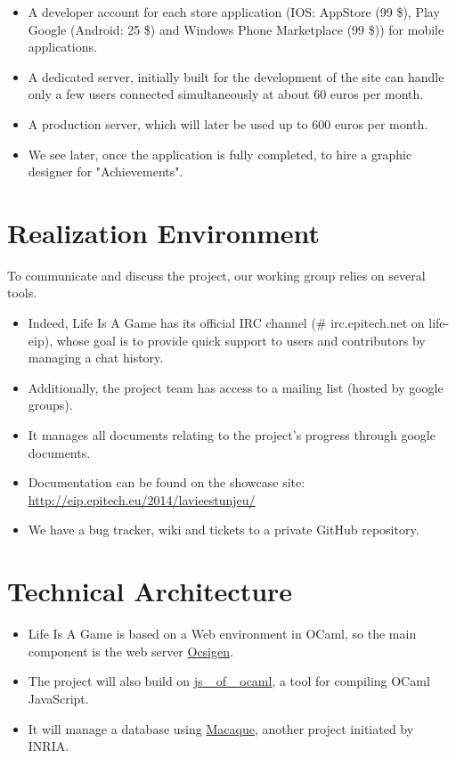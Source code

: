 \documentclass{life-fr}
\begin{document}
\begin{itemize}
  \item A developer account for each store application (IOS: AppStore (99 \$), Play Google (Android: 25 \$) and Windows Phone Marketplace (99 \$)) for mobile applications.
  \item A dedicated server, initially built for the development of the site can handle only a few users connected simultaneously at about 60 euros per month.
  \item A production server, which will later be used up to 600 euros per month.
  \item We see later, once the application is fully completed, to hire a graphic designer for "Achievements".
\end{itemize}

\newpage

\section{Realization Environment}

To communicate and discuss the project, our working group relies on several tools.

\begin{itemize}
  \item Indeed, Life Is A Game has its official IRC channel (\# irc.epitech.net on life-eip), whose goal is to provide quick support to users and contributors by managing a chat history.
  \item Additionally, the project team has access to a mailing list (hosted by google groups).
  \item It manages all documents relating to the project's progress through google documents.
  \item Documentation can be found on the showcase site: \url {http://eip.epitech.eu/2014/lavieestunjeu/}
  \item We have a bug tracker, wiki and tickets to a private GitHub repository.
\end{itemize}

\section{Technical Architecture}

\begin{itemize}
  \item Life Is A Game is based on a Web environment in OCaml, so the main component is the web server \href{http://ocsigen.org/}{Ocsigen}.
  \item The project will also build on \href {http://ocsigen.org/js_of_ocaml/}{js \_of \_ocaml}, a tool for compiling OCaml JavaScript.
  \item It will manage a database using \href {http://ocsigen.org/macaque/}{Macaque}, another project initiated by INRIA.
\end{itemize}
\end{document}
